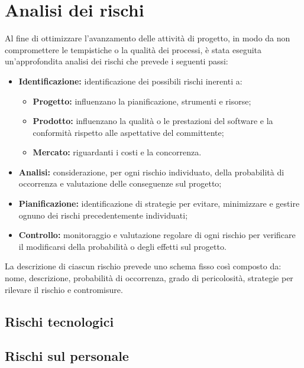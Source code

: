 \section{Analisi dei rischi}
Al fine di ottimizzare l'avanzamento delle attività di progetto, in modo da non compromettere le tempistiche o la qualità dei processi, è stata eseguita un'approfondita analisi dei rischi che prevede i seguenti passi:
\begin{itemize}
\item \textbf{Identificazione:} identificazione dei possibili rischi inerenti a:
	\begin{itemize}
	\item \textbf{Progetto:} influenzano la pianificazione, strumenti e risorse;
	\item \textbf{Prodotto:} influenzano la qualità o le prestazioni del software e la conformità rispetto alle aspettative del committente;
	\item \textbf{Mercato:} riguardanti i costi e la concorrenza.
	\end{itemize}
\item \textbf{Analisi:} considerazione, per ogni rischio individuato, della probabilità di occorrenza e valutazione delle conseguenze sul progetto;
\item \textbf{Pianificazione:} identificazione di strategie per evitare, minimizzare e gestire ognuno dei rischi precedentemente individuati;
\item \textbf{Controllo:} monitoraggio e valutazione regolare di ogni rischio per verificare il modificarsi della probabilità o degli effetti sul progetto.
\end{itemize}
La descrizione di ciascun rischio prevede uno schema fisso così composto da: nome, descrizione, probabilità di occorrenza, grado di pericolosità, strategie per rilevare il rischio e contromisure. 

\subsection{Rischi tecnologici}

\subsection{Rischi sul personale}
